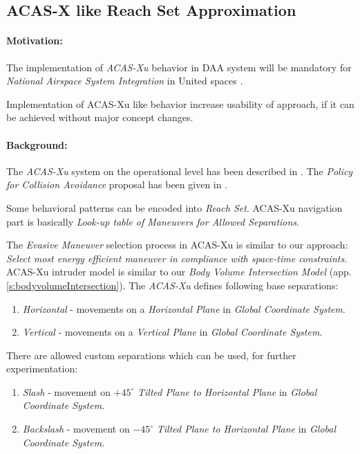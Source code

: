 \subsection{ACAS-X like Reach Set Approximation}\label{s:acasReachSet}
\paragraph{Motivation:} The implementation of \emph{ACAS-Xu} behavior in DAA system will  be mandatory for \emph{National Airspace System Integration} in United spaces \cite{shively2018uas}. 

Implementation of ACAS-Xu like behavior increase usability of approach, if it can be achieved without major concept changes.


\paragraph{Background:} The \emph{ACAS-Xu} system on the operational level has been described in \cite{marston2015acas}. The \emph{Policy for Collision Avoidance} proposal has been given in \cite{julian2016policy}.

Some behavioral patterns can be encoded into  \emph{Reach Set}. ACAS-Xu navigation part is basically \emph{Look-up table of Maneuvers for Allowed Separations}.
 
The \emph{Evasive Maneuver} selection process in ACAS-Xu is similar to our approach: \emph{Select most energy efficient maneuver in compliance with space-time constraints}. ACAS-Xu intruder model is similar to our \emph{Body Volume Intersection Model} (app. \ref{s:bodyvolumeIntersection}). The \emph{ACAS-Xu} defines following base separations:

\begin{enumerate}
    \item \emph{Horizontal} - movements on a \emph{Horizontal Plane} in \emph{Global Coordinate System}.
    
    \item \emph{Vertical} - movements on a \emph{Vertical Plane} in \emph{Global Coordinate System}.
    
\end{enumerate}

\noindent There are allowed custom separations which can be used, for further experimentation: 
\begin{enumerate}
    \item \emph{Slash} - movement on $+45^{\circ}$ \emph{Tilted Plane to Horizontal Plane} in \emph{Global Coordinate System}.
    
    \item \emph{Backslash} - movement on $-45^{\circ}$ \emph{Tilted Plane to Horizontal Plane} in \emph{Global Coordinate System}.
    
\end{enumerate}

